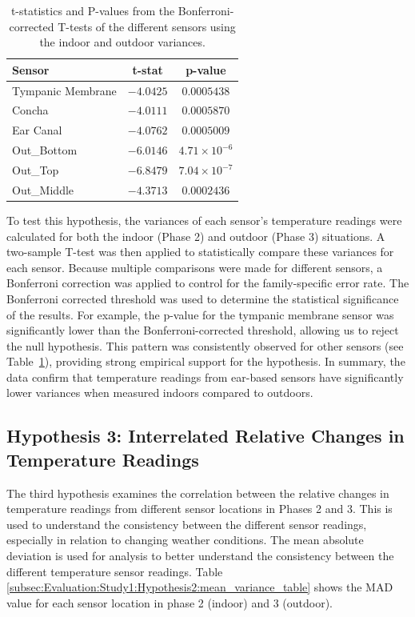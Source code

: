 \begin{table}[h]
\centering
\begin{tabularx}{\textwidth}{|X|c|c|}
\hline
\textbf{Sensor} & \textbf{t-stat} & \textbf{p-value} \\
\hline
Tympanic Membrane & \(-4.0425\) & \(0.0005438\) \\
Concha & \(-4.0111\) & \(0.0005870\) \\
Ear Canal & \(-4.0762\) & \(0.0005009\) \\
Out\_Bottom & \(-6.0146\) & \(4.71 \times 10^{-6}\) \\
Out\_Top & \(-6.8479\) & \(7.04 \times 10^{-7}\) \\
Out\_Middle & \(-4.3713\) & \(0.0002436\) \\
\hline
\end{tabularx}
\caption{t-statistics and P-values from the Bonferroni-corrected T-tests of the different sensors using the indoor and outdoor variances. }
\label{subsec:Evaluation:Study1:Hypothesis2:pvalues}
\end{table}

To test this hypothesis, the variances of each sensor's temperature readings were calculated for both the indoor (Phase 2) and outdoor (Phase 3) situations.
A two-sample T-test was then applied to statistically compare these variances for each sensor.
Because multiple comparisons were made for different sensors, a Bonferroni correction was applied to control for the family-specific error rate.
The Bonferroni corrected threshold was used to determine the statistical significance of the results.
For example, the p-value for the tympanic membrane sensor was significantly lower than the Bonferroni-corrected threshold, allowing us to reject the null hypothesis.
This pattern was consistently observed for other sensors (see Table~\ref{subsec:Evaluation:Study1:Hypothesis2:pvalues}), providing strong empirical support for the hypothesis.
In summary, the data confirm that temperature readings from ear-based sensors have significantly lower variances when measured indoors compared to outdoors.

\subsection{Hypothesis 3: Interrelated Relative Changes in Temperature Readings}
\label{subsec:Evaluation:Study1:Hypothesis3}
The third hypothesis examines the correlation between the relative changes in temperature readings from different sensor locations in Phases 2 and 3.
This is used to understand the consistency between the different sensor readings, especially in relation to changing weather conditions.
The mean absolute deviation is used for analysis to better understand the consistency between the different temperature sensor readings. 
Table \ref{subsec:Evaluation:Study1:Hypothesis2:mean_variance_table} shows the MAD value for each sensor location in phase 2 (indoor) and 3 (outdoor).

